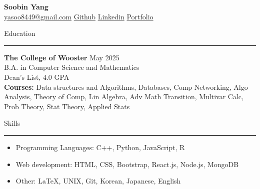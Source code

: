 \documentclass[a4paper,12pt]{article}
\begin{document}
\linespread{1}\selectfont
{}
\newcommand{\sectionrule}[1]{
  \vspace{5pt}
  \RaggedRight
  \textnormal{#1}
  \hrule
  \vspace{3pt}
}
\pagestyle{empty}

\begin{center}
    \textbf{\Large Soobin Yang}\\
    \faEnvelope \href{mailto:yasoo8449@gmail.com}{yasoo8449@gmail.com} \hspace{1pt}
    \faGithubSquare \href{https://github.com/uliba3}{Github} \hspace{1pt}
    \faLinkedinSquare \href{https://linkedin.com/in/soobinyang8449}{Linkedin} \hspace{1pt}
    \faGlobe \href{https://uliba3.github.io/portfolio/}{Portfolio}
\end{center}

\vspace{-20pt}

\sectionrule{Education}
\textbf{The College of Wooster} \hfill \textnormal{May 2025}\\
\textnormal{B.A. in Computer Science and Mathematics}\\
\textnormal{Dean's List, 4.0 GPA}\\
\textbf{Courses:} \textnormal{Data structures and Algorithms, Databases, Comp Networking, Algo Analysis, Theory of Comp, Lin Algebra, Adv Math Transition, Multivar Calc, Prob Theory, Stat Theory, Applied Stats}


\sectionrule{Skills}
\begin{itemize}
    \item \textnormal{Programming Languages:} C++, Python, JavaScript, R
    \item \textnormal{Web development:} HTML, CSS, Bootstrap, React.js, Node.js, MongoDB
    \item \textnormal{Other:} LaTeX, UNIX, Git, Korean, Japanese, English
\end{itemize}
\end{document}

